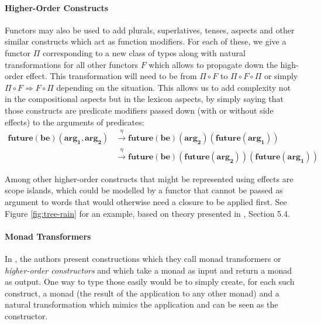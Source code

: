\paragraph{Higher-Order Constructs}
\label{par:higherorder}
Functors may also be used to add plurals, superlatives, tenses, aspects and
other similar constructs which act as function modifiers.
For each of these, we give a functor $\Pi$ corresponding to a new class of
types along with natural transformations for all other functors $F$ which
allows to propagate down the high-order effect.
This transformation will need to be from $\Pi \circ F$ to
$\Pi \circ F \circ \Pi$ or simply $\Pi \circ F \Rightarrow F \circ \Pi$
depending on the situation.
This allows us to add complexity not in the compositional aspects but
in the lexicon aspects, by simply saying that those constructs are predicate
modifiers passed down (with or without side effects) to the arguments of
predicates:
\begin{equation*}
	\begin{aligned}
		\mathbf{future\left( be \right)\left( arg_{1}, arg_{2} \right)}
		 & \xrightarrow{\eta} \mathbf{future\left( be \right)\left( arg_{2} \right)\left( future\left( arg_{1} \right) \right)}                           \\
		 & \xrightarrow{\eta} \mathbf{future \left( be \right) \left( future \left( arg_{2} \right) \right) \left( future \left( arg_{1} \right) \right)}
	\end{aligned}
\end{equation*}

Among other higher-order constructs that might be represented using effects are
scope islands, which could be modelled by a functor that cannot be
passed as argument to words that would otherwise need a closure to be applied
first.
See Figure \ref{fig:tree-rain} for an example, based on theory presented in
\cite{bumfordEffectdrivenInterpretationFunctors2025}, Section 5.4.

\paragraph{Monad Transformers}
In \cite{bumfordEffectdrivenInterpretationFunctors2025}, the authors present
constructions which they call monad transformers or \emph{higher-order
	constructors} and which take a monad as input and return a monad as output.
One way to type those easily would be to simply create, for each such
construct, a monad (the result of the application to any other monad) and a
natural transformation which mimics the application and can be seen as the
constructor.

